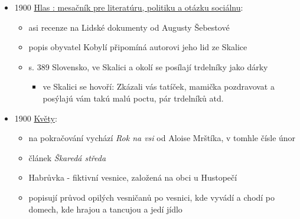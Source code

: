 \begin{itemize}
\begin{itemize}
    \begin{itemize}
    \tightlist
    \item
      recept na smaženej v sádle
    \item
      těsto z kvásku, vajec, cukru, zadělá se smetanou nebo mlíkem
    \item
      po vykynutí se namotá plástek těsta okolo formy, obtočí šňůrkou a
      dá do vřelýho sádla
    \item
      po osmažení se šňůrka odtočí, posype se cukrem se skořicí
    \end{itemize}
  \item
    s. 113 trdelník se jí na zabijačce
  \end{itemize}
\item
  1900
  \href{https://dikda.snk.sk/uuid/uuid:7f57fb99-b746-49c2-9b31-a09b7a646c02}{Hlas
  : mesačník pre literatúru, politiku a otázku sociálnu}:

  \begin{itemize}
  \tightlist
  \item
    asi recenze na Lidské dokumenty od Augusty Šebestové
  \item
    popis obyvatel Kobylí připomíná autorovi jeho lid ze Skalice
  \item
    s. 389 Slovensko, ve Skalici a okolí se posílají trdelníky jako
    dárky

    \begin{itemize}
    \tightlist
    \item
      ve Skalici se hovoří: Zkázali vás tatíček, mamička pozdravovat a
      posýlajú vám takú malú poctu, pár trdelníků atd.
    \end{itemize}
  \end{itemize}
\item
  1900
  \href{https://ceskadigitalniknihovna.cz/uuid/uuid:24bda940-8ab0-11ed-8f7f-5ef3fc9bb22f}{Květy}:

  \begin{itemize}
  \tightlist
  \item
    na pokračování vychází \emph{Rok na vsi} od Aloise Mrštíka, v tomhle
    čísle únor 
  \item
    článek \emph{Škaredá středa}
  \item
    Habrůvka - fiktivní vesnice, založená na obci  u
    Hustopečí
  \item
    popisují průvod opilých vesničanů po vesnici, kde vyvádí a chodí po
    domech, kde hrajou a tancujou a jedí jídlo


\end{itemize}
\end{itemize}
